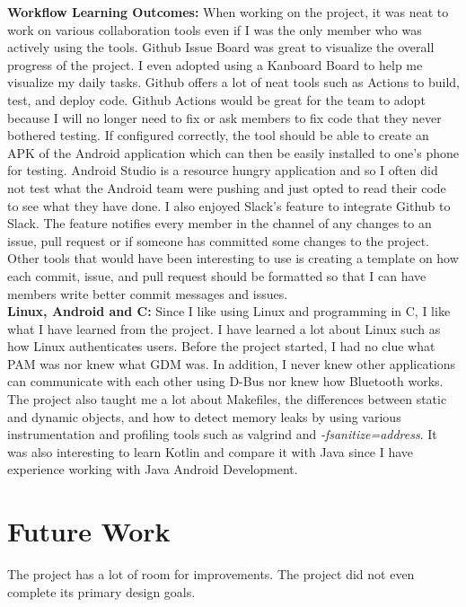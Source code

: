 \documentclass[letterpaper,twocolumn,10pt]{article}
\begin{document}
{{\noindent\textbf{Workflow Learning Outcomes:} When working on the project, it was neat to work on various collaboration tools even if I was the only member who was actively using the tools. Github Issue Board was great to visualize the overall progress of the project. I even adopted using a Kanboard Board to help me visualize my daily tasks. Github offers a lot of neat tools such as Actions to build, test, and deploy code. Github Actions would be great for the team to adopt because I will no longer need to fix or ask members to fix code that they never bothered testing. If configured correctly, the tool should be able to create an APK of the Android application which can then be easily installed to one's phone for testing. Android Studio is a resource hungry application and so I often did not test what the Android team were pushing and just opted to read their code to see what they have done. I also enjoyed Slack's feature to integrate Github to Slack. The feature notifies every member in the channel of any changes to an issue, pull request or if someone has committed some changes to the project. Other tools that would have been interesting to use is creating a template on how each commit, issue, and pull request should be formatted so that I can have members write better commit messages and issues. \\

\noindent\textbf{Linux, Android and C:} Since I like using Linux and programming in C, I like what I have learned from the project. I have learned a lot about Linux such as how Linux authenticates users. Before the project started, I had no clue what PAM was nor knew what GDM was. In addition, I never knew other applications can communicate with each other using D-Bus nor knew how Bluetooth works. The project also taught me a lot about Makefiles, the differences between static and dynamic objects, and how to detect memory leaks by using various instrumentation and profiling tools such as valgrind and \emph{-fsanitize=address}. It was also interesting to learn Kotlin and compare it with Java since I have experience working with Java Android Development.

\section{Future Work}

The project has a lot of room for improvements. The project did not even complete its primary design goals. 

}}
\end{document}
